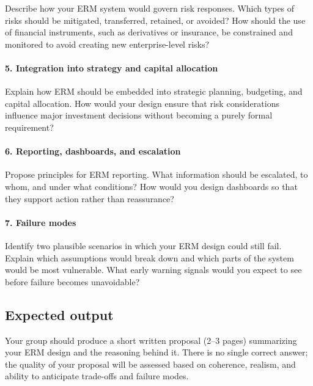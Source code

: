 \documentclass[11pt]{article}
\begin{document}
Describe how your ERM system would govern risk responses.
Which types of risks should be mitigated, transferred, retained, or avoided?
How should the use of financial instruments, such as derivatives or insurance,
be constrained and monitored to avoid creating new enterprise-level risks?

\paragraph{5. Integration into strategy and capital allocation}

Explain how ERM should be embedded into strategic planning, budgeting, and
capital allocation.
How would your design ensure that risk considerations influence major
investment decisions without becoming a purely formal requirement?

\paragraph{6. Reporting, dashboards, and escalation}

Propose principles for ERM reporting.
What information should be escalated, to whom, and under what conditions?
How would you design dashboards so that they support action rather than
reassurance?

\paragraph{7. Failure modes}

Identify two plausible scenarios in which your ERM design could still fail.
Explain which assumptions would break down and which parts of the system would
be most vulnerable. What early warning signals would you expect to see before
failure becomes unavoidable?

\subsection*{Expected output}

Your group should produce a short written proposal (2--3 pages) summarizing
your ERM design and the reasoning behind it. There is no single correct answer;
the quality of your proposal will be assessed based on coherence, realism, and
ability to anticipate trade-offs and failure modes.
\end{document}
